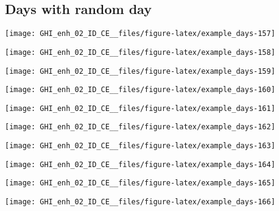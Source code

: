 \documentclass[
  10pt,
  a4paper,oneside]{article}
\begin{document}
\FloatBarrier

\hypertarget{days-with-random-day}{%
\subsection{Days with random day}\label{days-with-random-day}}

\begin{center}\texttt{[image: GHI\_enh\_02\_ID\_CE\_\_files/figure-latex/example\_days-157]} \end{center}

\begin{center}\texttt{[image: GHI\_enh\_02\_ID\_CE\_\_files/figure-latex/example\_days-158]} \end{center}

\begin{center}\texttt{[image: GHI\_enh\_02\_ID\_CE\_\_files/figure-latex/example\_days-159]} \end{center}

\begin{center}\texttt{[image: GHI\_enh\_02\_ID\_CE\_\_files/figure-latex/example\_days-160]} \end{center}

\begin{center}\texttt{[image: GHI\_enh\_02\_ID\_CE\_\_files/figure-latex/example\_days-161]} \end{center}

\begin{center}\texttt{[image: GHI\_enh\_02\_ID\_CE\_\_files/figure-latex/example\_days-162]} \end{center}

\begin{center}\texttt{[image: GHI\_enh\_02\_ID\_CE\_\_files/figure-latex/example\_days-163]} \end{center}

\begin{center}\texttt{[image: GHI\_enh\_02\_ID\_CE\_\_files/figure-latex/example\_days-164]} \end{center}

\begin{center}\texttt{[image: GHI\_enh\_02\_ID\_CE\_\_files/figure-latex/example\_days-165]} \end{center}

\begin{center}\texttt{[image: GHI\_enh\_02\_ID\_CE\_\_files/figure-latex/example\_days-166]} \end{center}
\end{document}
